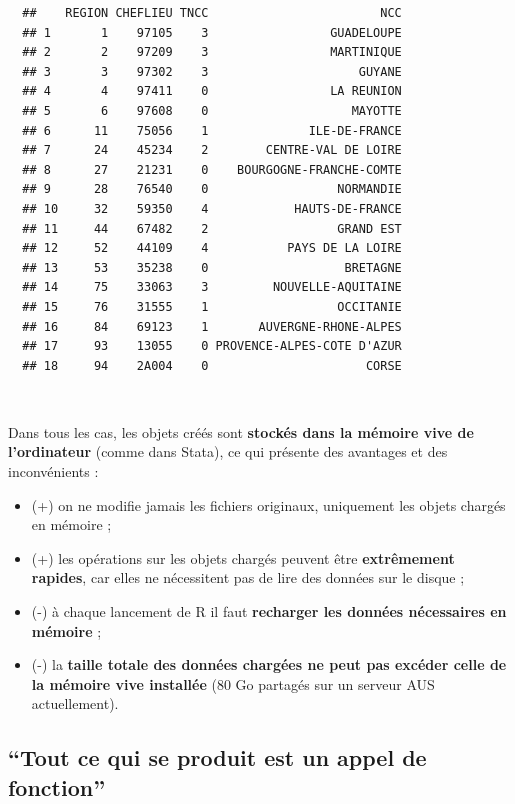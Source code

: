\documentclass[12pt,twosided, notitlepage]{book}
\providecommand{\tightlist}{%
  \setlength{\itemsep}{0pt}\setlength{\parskip}{0pt}}
\begin{document}
\begin{verbatim}
  ##    REGION CHEFLIEU TNCC                        NCC
  ## 1       1    97105    3                 GUADELOUPE
  ## 2       2    97209    3                 MARTINIQUE
  ## 3       3    97302    3                     GUYANE
  ## 4       4    97411    0                 LA REUNION
  ## 5       6    97608    0                    MAYOTTE
  ## 6      11    75056    1              ILE-DE-FRANCE
  ## 7      24    45234    2        CENTRE-VAL DE LOIRE
  ## 8      27    21231    0    BOURGOGNE-FRANCHE-COMTE
  ## 9      28    76540    0                  NORMANDIE
  ## 10     32    59350    4            HAUTS-DE-FRANCE
  ## 11     44    67482    2                  GRAND EST
  ## 12     52    44109    4           PAYS DE LA LOIRE
  ## 13     53    35238    0                   BRETAGNE
  ## 14     75    33063    3         NOUVELLE-AQUITAINE
  ## 15     76    31555    1                  OCCITANIE
  ## 16     84    69123    1       AUVERGNE-RHONE-ALPES
  ## 17     93    13055    0 PROVENCE-ALPES-COTE D'AZUR
  ## 18     94    2A004    0                      CORSE
\end{verbatim}

~

Dans tous les cas, les objets créés sont \textbf{stockés dans la mémoire
vive de l'ordinateur} (comme dans Stata), ce qui présente des avantages
et des inconvénients :

\begin{itemize}
\tightlist
\item
  (+) on ne modifie jamais les fichiers originaux, uniquement les objets
  chargés en mémoire ;
\item
  (+) les opérations sur les objets chargés peuvent être
  \textbf{extrêmement rapides}, car elles ne nécessitent pas de lire des
  données sur le disque ;
\item
  (-) à chaque lancement de R il faut \textbf{recharger les données
  nécessaires en mémoire} ;
\item
  (-) la \textbf{taille totale des données chargées ne peut pas excéder
  celle de la mémoire vive installée} (80 Go partagés sur un serveur AUS
  actuellement).
\end{itemize}

\subsection{\texorpdfstring{\enquote{Tout ce qui se produit est un appel
de
fonction}}{Tout ce qui se produit est un appel de fonction}}\label{tout-ce-qui-se-produit-est-un-appel-de-fonction}
\end{document}
